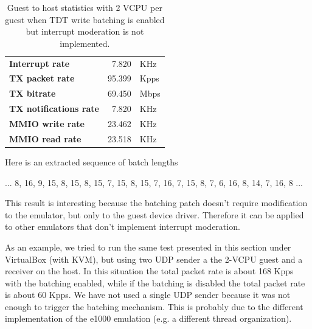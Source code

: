 \begin{table}
\begin{center}
\begin{tabular}{lrl}
\toprule
\textbf{Interrupt rate} & 7.820 & KHz\\
\textbf{TX packet rate} & 95.399 & Kpps\\
\textbf{TX bitrate} & 69.450 & Mbps\\
\textbf{TX notifications rate} & 7.820 & KHz\\
\textbf{MMIO write rate} & 23.462 & KHz\\
\textbf{MMIO read rate} & 23.518 & KHz\\
\bottomrule
\end{tabular}
\end{center}
\caption{Guest to host statistics with 2 VCPU per guest when TDT write batching is enabled but interrupt moderation is not implemented.}
\label{tab:e1000-bat-tx-g2h2vcpu}
\end{table}

Here is an extracted sequence of batch lengths

\begin{center}
... 8, 16, 9, 15, 8, 15, 8, 15, 7, 15, 8, 15, 7, 16, 7, 15, 8, 7, 6, 16, 8, 14, 7, 16, 8 ...
\end{center}

\vspace{0.5cm}

This result is interesting because the batching patch doesn't require modification to the emulator, but only to the guest device driver.
Therefore it can be applied to other emulators that don't implement interrupt moderation.

As an example, we tried to run the same test presented in this section under VirtualBox (with KVM), but using two UDP sender a the 2-VCPU
guest and a receiver on the host. In this situation the total packet rate is about 168 Kpps with the batching enabled, while if
the batching is disabled the total packet rate is about 60 Kpps. We have not used a single UDP sender because it was not enough to trigger
the batching mechanism. This is probably due to the different implementation of the e1000 emulation (e.g. a different thread organization).

